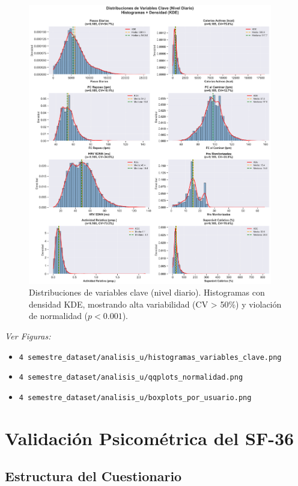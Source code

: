 \documentclass[12pt,letterpaper,twoside]{report}
\begin{document}
\begin{figure}[htbp]
\centering
\includegraphics[width=0.95\textwidth]{../analisis_u/descriptivos_visuales/histogramas_con_kde.png}
\caption{Distribuciones de variables clave (nivel diario). Histogramas con densidad KDE, mostrando alta variabilidad (CV > 50\%) y violación de normalidad ($p < 0.001$).}
\label{fig:histogramas_kde}
\end{figure}


\textit{Ver Figuras:}
\begin{itemize}[noitemsep]
    \item \texttt{4 semestre\_dataset/analisis\_u/histogramas\_variables\_clave.png}
    \item \texttt{4 semestre\_dataset/analisis\_u/qqplots\_normalidad.png}
    \item \texttt{4 semestre\_dataset/analisis\_u/boxplots\_por\_usuario.png}
\end{itemize}

\section{Validación Psicométrica del SF-36}

\subsection{Estructura del Cuestionario}
\end{document}
